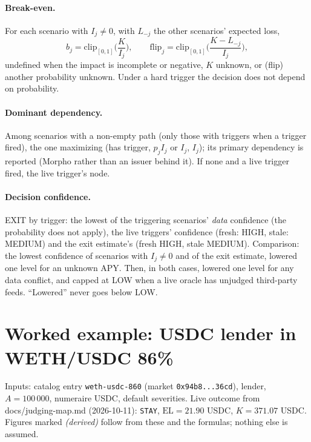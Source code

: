 \documentclass[11pt,a4paper]{article}
\newcommand{\code}[1]{\texttt{#1}}
\newcommand{\src}[1]{\textsf{\small #1}}
\begin{document}
\paragraph{Break-even.} For each scenario with $I_j\neq0$, with $L_{-j}$ the
other scenarios' expected loss,
\begin{equation}
b_j=\mathrm{clip}_{[0,1]}\!\Big(\frac{K}{I_j}\Big),\qquad
\text{flip}_j=\mathrm{clip}_{[0,1]}\!\Big(\frac{K-L_{-j}}{I_j}\Big),
\end{equation}
undefined when the impact is incomplete or negative, $K$ unknown, or (flip) another
probability unknown. Under a hard trigger the decision does not depend on
probability.

\paragraph{Dominant dependency.} Among scenarios with a non-empty path (only those
with triggers when a trigger fired), the one maximizing (has trigger, $p_jI_j$ or
$I_j$, $I_j$); its primary dependency is reported (Morpho rather than an issuer
behind it). If none and a live trigger fired, the live trigger's node.

\paragraph{Decision confidence.} EXIT by trigger: the lowest of the triggering
scenarios' \emph{data} confidence (the probability does not apply), the live
triggers' confidence (fresh: HIGH, stale: MEDIUM) and the exit estimate's (fresh
HIGH, stale MEDIUM). Comparison: the lowest confidence of scenarios with
$I_j\neq0$ and of the exit estimate, lowered one level for an unknown APY. Then,
in both cases, lowered one level for any data conflict, and capped at LOW when a
live oracle has unjudged third-party feeds. ``Lowered'' never goes below LOW.

\section{Worked example: USDC lender in WETH/USDC 86\%}

Inputs: catalog entry \code{weth-usdc-860} (market
\code{0x94b8...36cd}), lender, $A=100\,000$, numeraire USDC, default severities.
Live outcome from \src{docs/judging-map.md} (2026-10-11): \code{STAY},
$\mathrm{EL}=21.90$ USDC, $K=371.07$ USDC. Figures marked \emph{(derived)} follow
from these and the formulas; nothing else is assumed.
\end{document}
